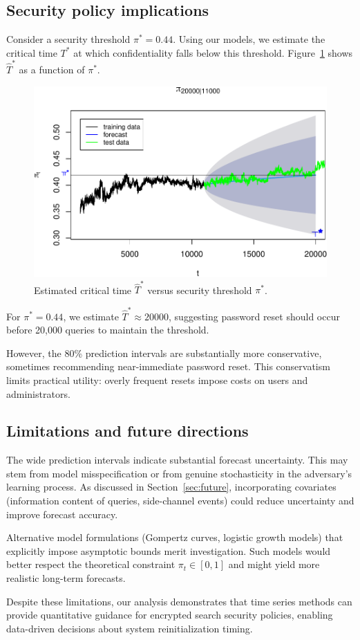 \documentclass[final,11pt]{article}
\theoremstyle{plain}
\theoremstyle{remark}
\begin{document}
\subsection{Security policy implications}

Consider a security threshold $\pi^* = 0.44$. Using our models, we
estimate the critical time $T^*$ at which confidentiality falls below
this threshold. Figure~\ref{fig:tstar} shows $\hat{T}^*$ as a function
of $\pi^*$.

\begin{figure}
    \includegraphics{Tstar.pdf}
    \caption{Estimated critical time $\hat{T}^*$ versus security threshold $\pi^*$.}
    \label{fig:tstar}
\end{figure}

For $\pi^* = 0.44$, we estimate $\hat{T}^* \approx 20000$, suggesting
password reset should occur before 20,000 queries to maintain the
threshold.

However, the 80\% prediction intervals are substantially more conservative,
sometimes recommending near-immediate password reset. This conservatism
limits practical utility: overly frequent resets impose costs on users
and administrators.

\subsection{Limitations and future directions}

The wide prediction intervals indicate substantial forecast uncertainty.
This may stem from model misspecification or from genuine stochasticity
in the adversary's learning process. As discussed in Section~\ref{sec:future},
incorporating covariates (information content of queries, side-channel
events) could reduce uncertainty and improve forecast accuracy.

Alternative model formulations (Gompertz curves, logistic growth models)
that explicitly impose asymptotic bounds merit investigation. Such models
would better respect the theoretical constraint $\pi_t \in [0,1]$ and
might yield more realistic long-term forecasts.

Despite these limitations, our analysis demonstrates that time series
methods can provide quantitative guidance for encrypted search security
policies, enabling data-driven decisions about system reinitialization
timing.





\end{document}
